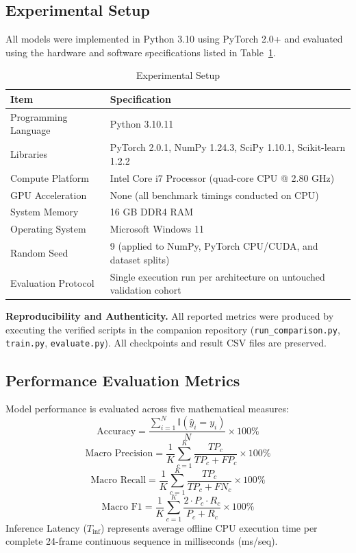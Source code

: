 \documentclass[conference]{IEEEtran}
\begin{document}
\subsection{Experimental Setup}
All models were implemented in Python 3.10 using PyTorch 2.0+ and evaluated using the hardware and software specifications listed in Table~\ref{tab:setup}.

\begin{table}[h]
\centering
\caption{Experimental Setup}
\label{tab:setup}
\begin{tabular}{p{2.5cm}p{5.3cm}}
\toprule
\textbf{Item} & \textbf{Specification} \\
\midrule
Programming Language & Python 3.10.11 \\
Libraries & PyTorch 2.0.1, NumPy 1.24.3, SciPy 1.10.1, Scikit-learn 1.2.2 \\
Compute Platform & Intel Core i7 Processor (quad-core CPU @ 2.80 GHz) \\
GPU Acceleration & None (all benchmark timings conducted on CPU) \\
System Memory & 16 GB DDR4 RAM \\
Operating System & Microsoft Windows 11 \\
Random Seed & 9 (applied to NumPy, PyTorch CPU/CUDA, and dataset splits) \\
Evaluation Protocol & Single execution run per architecture on untouched validation cohort \\
\bottomrule
\end{tabular}
\end{table}

\textbf{Reproducibility and Authenticity.} All reported metrics were produced by executing the verified scripts in the companion repository (\texttt{run\_comparison.py}, \texttt{train.py}, \texttt{evaluate.py}). All checkpoints and result CSV files are preserved.

\subsection{Performance Evaluation Metrics}
Model performance is evaluated across five mathematical measures:
\begin{equation}
\text{Accuracy} = \frac{\sum_{i=1}^N \mathbb{I}(\hat{y}_i = y_i)}{N} \times 100\%
\end{equation}
\begin{equation}
\text{Macro Precision} = \frac{1}{K} \sum_{c=1}^K \frac{TP_c}{TP_c + FP_c} \times 100\%
\end{equation}
\begin{equation}
\text{Macro Recall} = \frac{1}{K} \sum_{c=1}^K \frac{TP_c}{TP_c + FN_c} \times 100\%
\end{equation}
\begin{equation}
\text{Macro F1} = \frac{1}{K} \sum_{c=1}^K \frac{2 \cdot P_c \cdot R_c}{P_c + R_c} \times 100\%
\end{equation}
Inference Latency ($T_{\text{inf}}$) represents average offline CPU execution time per complete 24-frame continuous sequence in milliseconds (ms/seq).
\end{document}
